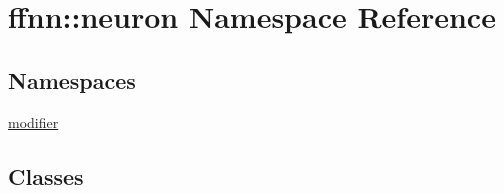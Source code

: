 \hypertarget{namespaceffnn_1_1neuron}{\section{ffnn\-:\-:neuron Namespace Reference}
\label{namespaceffnn_1_1neuron}
}
\subsection*{Namespaces}
\begin{DoxyCompactItemize}
\item 
\hyperlink{namespaceffnn_1_1neuron_1_1modifier}{modifier}
\end{DoxyCompactItemize}
\subsection*{Classes}

